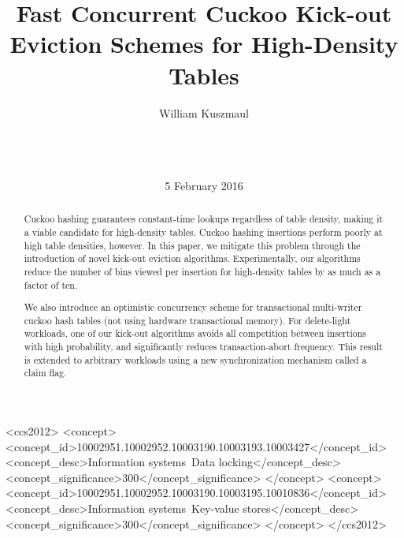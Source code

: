 \documentclass{sig-alternate-05-2015}
\begin{document}
\title{Fast Concurrent Cuckoo Kick-out Eviction Schemes for High-Density Tables}
\subtitle{}


 \author{
\alignauthor
William Kuszmaul\\
       \\
       \\
       \\
}
\date{5 February 2016}


\maketitle
\begin{abstract}
  
  Cuckoo hashing guarantees constant-time lookups regardless of table
  density, making it a viable candidate for high-density
  tables. Cuckoo hashing insertions perform poorly at high table
  densities, however. In this paper, we mitigate this problem through
  the introduction of novel kick-out eviction
  algorithms. Experimentally, our algorithms reduce the number of bins
  viewed per insertion for high-density tables by as much as a factor
  of ten.

  We also introduce an optimistic concurrency scheme for transactional
  multi-writer cuckoo hash tables (not using hardware transactional
  memory). For delete-light workloads, one of our kick-out algorithms
  avoids all competition between insertions with high probability, and
  significantly reduces transaction-abort frequency. This result is
  extended to arbitrary workloads using a new synchronization
  mechanism called a claim flag.
\end{abstract}


\begin{CCSXML}
<ccs2012>
<concept>
<concept_id>10002951.10002952.10003190.10003193.10003427</concept_id>
<concept_desc>Information systems~Data locking</concept_desc>
<concept_significance>300</concept_significance>
</concept>
<concept>
<concept_id>10002951.10002952.10003190.10003195.10010836</concept_id>
<concept_desc>Information systems~Key-value stores</concept_desc>
<concept_significance>300</concept_significance>
</concept>
</ccs2012>
\end{CCSXML}

\end{document}
